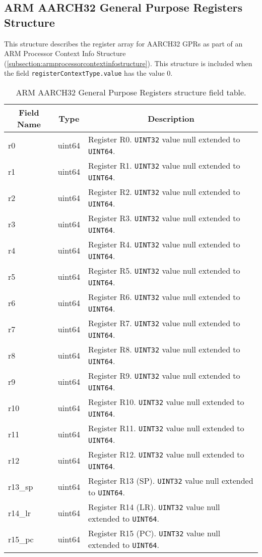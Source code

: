 \documentclass{report}
\newcommand*{\thead}[1]{\multicolumn{1}{|c|}{\bfseries #1}}
\newcommand*{\jsontable}[1]{
    \begin{table}[!ht]
    \label{#1}
    \centering
    \begin{adjustbox}{center}
    \begin{tabular}{|l|c|p{8cm}|}
    \hline
    \thead{Field Name} & \thead{Type} & \thead{Description} \\
    \hline
}
\newcommand*{\jsontableend}[1]{
    \hline
    \end{tabular}
    \end{adjustbox}
    \caption{#1}
    \label{table:#1}
    \end{table}
    \FloatBarrier
}
\begin{document}
\subsection{ARM AARCH32 General Purpose Registers Structure}
\label{subsection:armaarch32gprstructure}
This structure describes the register array for AARCH32 GPRs as part of an ARM Processor Context Info Structure (\ref{subsection:armprocessorcontextinfostructure}). This structure is included when the field \texttt{registerContextType.value} has the value 0.
\jsontable{table:armaarch32gprstructure}
r0 & uint64 & Register R0. \texttt{UINT32} value null extended to \texttt{UINT64}.\\
\hline
r1 & uint64 & Register R1. \texttt{UINT32} value null extended to \texttt{UINT64}.\\
\hline
r2 & uint64 & Register R2. \texttt{UINT32} value null extended to \texttt{UINT64}.\\
\hline
r3 & uint64 & Register R3. \texttt{UINT32} value null extended to \texttt{UINT64}.\\
\hline
r4 & uint64 & Register R4. \texttt{UINT32} value null extended to \texttt{UINT64}.\\
\hline
r5 & uint64 & Register R5. \texttt{UINT32} value null extended to \texttt{UINT64}.\\
\hline
r6 & uint64 & Register R6. \texttt{UINT32} value null extended to \texttt{UINT64}.\\
\hline
r7 & uint64 & Register R7. \texttt{UINT32} value null extended to \texttt{UINT64}.\\
\hline
r8 & uint64 & Register R8. \texttt{UINT32} value null extended to \texttt{UINT64}.\\
\hline
r9 & uint64 & Register R9. \texttt{UINT32} value null extended to \texttt{UINT64}.\\
\hline
r10 & uint64 & Register R10. \texttt{UINT32} value null extended to \texttt{UINT64}.\\
\hline
r11 & uint64 & Register R11. \texttt{UINT32} value null extended to \texttt{UINT64}.\\
\hline
r12 & uint64 & Register R12. \texttt{UINT32} value null extended to \texttt{UINT64}.\\
\hline
r13\_sp & uint64 & Register R13 (SP). \texttt{UINT32} value null extended to \texttt{UINT64}.\\
\hline
r14\_lr & uint64 & Register R14 (LR). \texttt{UINT32} value null extended to \texttt{UINT64}.\\
\hline
r15\_pc & uint64 & Register R15 (PC). \texttt{UINT32} value null extended to \texttt{UINT64}.\\
\jsontableend{ARM AARCH32 General Purpose Registers structure field table.}
\end{document}
